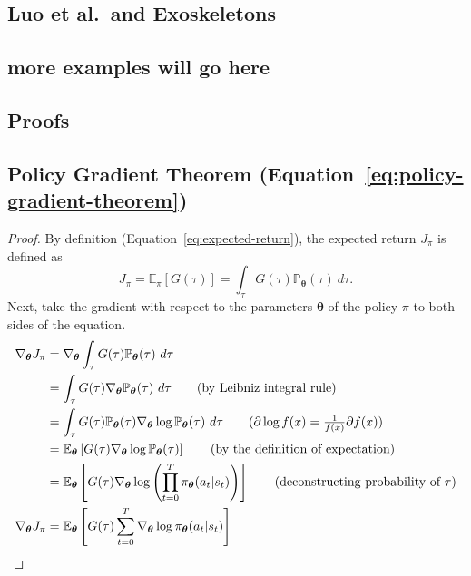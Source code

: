 \documentclass[12pt]{report}
\theoremstyle{definition}
\theoremstyle{remark}
\begin{document}
\cite{hutter_legged_2022}
\cite{lee_learning_2020}

\section{Luo et al.\ and Exoskeletons}
\cite{luo_reinforcement_2021}
\cite{luo_experiment-free_2024}


\section{more examples will go here}


\begin{appendices}
\chapter{Proofs}
\section{Policy Gradient Theorem (Equation~\ref{eq:policy-gradient-theorem})}\label{sec:policy-gradient-theorem-proof}
\begin{proof}
    By definition (Equation~\ref{eq:expected-return}), the expected return $J_\pi$ is defined as
    \begin{equation*}
        J_\pi = \mathbb{E}_\pi[G(\tau)] = \int_{\tau} G(\tau)\mathbb{P}_{\boldsymbol{\theta}}(\tau)\ d\tau.
    \end{equation*}
    Next, take the gradient with respect to the parameters $\boldsymbol{\theta}$ of the policy $\pi$ to both sides of the equation.
    \begin{align*}
        \nabla_{\boldsymbol{\theta}} J_\pi &= \nabla_{\boldsymbol{\theta}} \int_{\tau} G(\tau)\mathbb{P}_{\boldsymbol{\theta}}(\tau)\ d\tau \\
        &= \int_{\tau} G(\tau) \nabla_{\boldsymbol{\theta}} \mathbb{P}_{\boldsymbol{\theta}}(\tau)\ d\tau \tag{by Leibniz integral rule} \\
        &= \int_{\tau} G(\tau) \mathbb{P}_{\boldsymbol{\theta}}(\tau) \nabla_{\boldsymbol{\theta}} \log \mathbb{P}_{\boldsymbol{\theta}}(\tau)\ d\tau \tag{$\partial \log f(x) = \frac{1}{f(x)}\partial f(x)$} \\
        &= \mathbb{E}_{\boldsymbol{\theta}}\left[G(\tau) \nabla_{\boldsymbol{\theta}} \log \mathbb{P}_{\boldsymbol{\theta}}(\tau)\right] \tag{by the definition of expectation} \\
        &= \mathbb{E}_{\boldsymbol{\theta}}\left[G(\tau) \nabla_{\boldsymbol{\theta}} \log \left(\prod_{t=0}^{T} \pi_{\boldsymbol{\theta}}(a_t | s_t)\right)\right] \tag{deconstructing probability of $\tau$} \\
        \nabla_{\boldsymbol{\theta}} J_\pi &= \mathbb{E}_{\boldsymbol{\theta}}\left[G(\tau) \sum_{t=0}^{T} \nabla_{\boldsymbol{\theta}} \log \pi_{\boldsymbol{\theta}}(a_t | s_t)\right]
    \end{align*}
\end{proof}
\end{appendices}


\nocite{*} %

\printglossaries

\printbibliography
{}
\end{document}
